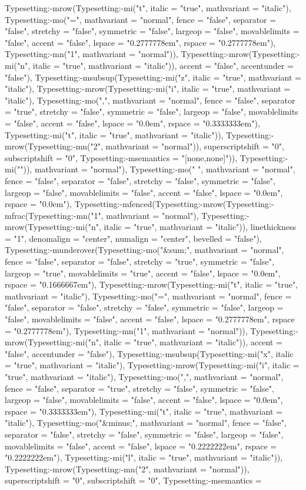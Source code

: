 \documentclass{article}
\begin{document}
\begin{Maple Normal}
{\begin{Maple Normal}
{Typesetting:-mrow(Typesetting:-mi("t", italic = "true", mathvariant = "italic"), Typesetting:-mo("=", mathvariant = "normal", fence = "false", separator = "false", stretchy = "false", symmetric = "false", largeop = "false", movablelimits = "false", accent = "false", lspace = "0.2777778em", rspace = "0.2777778em"), Typesetting:-mn("1", mathvariant = "normal")), Typesetting:-mrow(Typesetting:-mi("n", italic = "true", mathvariant = "italic")), accent = "false", accentunder = "false"), Typesetting:-msubsup(Typesetting:-mi("z", italic = "true", mathvariant = "italic"), Typesetting:-mrow(Typesetting:-mi("i", italic = "true", mathvariant = "italic"), Typesetting:-mo(",", mathvariant = "normal", fence = "false", separator = "true", stretchy = "false", symmetric = "false", largeop = "false", movablelimits = "false", accent = "false", lspace = "0.0em", rspace = "0.3333333em"), Typesetting:-mi("t", italic = "true", mathvariant = "italic")), Typesetting:-mrow(Typesetting:-mn("2", mathvariant = "normal")), superscriptshift = "0", subscriptshift = "0", Typesetting:-msemantics = "[none,none]")), Typesetting:-mi("")), mathvariant = "normal"), Typesetting:-mo(" ", mathvariant = "normal", fence = "false", separator = "false", stretchy = "false", symmetric = "false", largeop = "false", movablelimits = "false", accent = "false", lspace = "0.0em", rspace = "0.0em"), Typesetting:-mfenced(Typesetting:-mrow(Typesetting:-mfrac(Typesetting:-mn("1", mathvariant = "normal"), Typesetting:-mrow(Typesetting:-mi("n", italic = "true", mathvariant = "italic")), linethickness = "1", denomalign = "center", numalign = "center", bevelled = "false"), Typesetting:-munderover(Typesetting:-mo("&sum;", mathvariant = "normal", fence = "false", separator = "false", stretchy = "true", symmetric = "false", largeop = "true", movablelimits = "true", accent = "false", lspace = "0.0em", rspace = "0.1666667em"), Typesetting:-mrow(Typesetting:-mi("t", italic = "true", mathvariant = "italic"), Typesetting:-mo("=", mathvariant = "normal", fence = "false", separator = "false", stretchy = "false", symmetric = "false", largeop = "false", movablelimits = "false", accent = "false", lspace = "0.2777778em", rspace = "0.2777778em"), Typesetting:-mn("1", mathvariant = "normal")), Typesetting:-mrow(Typesetting:-mi("n", italic = "true", mathvariant = "italic")), accent = "false", accentunder = "false"), Typesetting:-msubsup(Typesetting:-mi("x", italic = "true", mathvariant = "italic"), Typesetting:-mrow(Typesetting:-mi("i", italic = "true", mathvariant = "italic"), Typesetting:-mo(",", mathvariant = "normal", fence = "false", separator = "true", stretchy = "false", symmetric = "false", largeop = "false", movablelimits = "false", accent = "false", lspace = "0.0em", rspace = "0.3333333em"), Typesetting:-mi("t", italic = "true", mathvariant = "italic"), Typesetting:-mo("&minus;", mathvariant = "normal", fence = "false", separator = "false", stretchy = "false", symmetric = "false", largeop = "false", movablelimits = "false", accent = "false", lspace = "0.2222222em", rspace = "0.2222222em"), Typesetting:-mi("l", italic = "true", mathvariant = "italic")), Typesetting:-mrow(Typesetting:-mn("2", mathvariant = "normal")), superscriptshift = "0", subscriptshift = "0", Typesetting:-msemantics = }
\end{Maple Normal}}
\end{Maple Normal}
\end{document}
